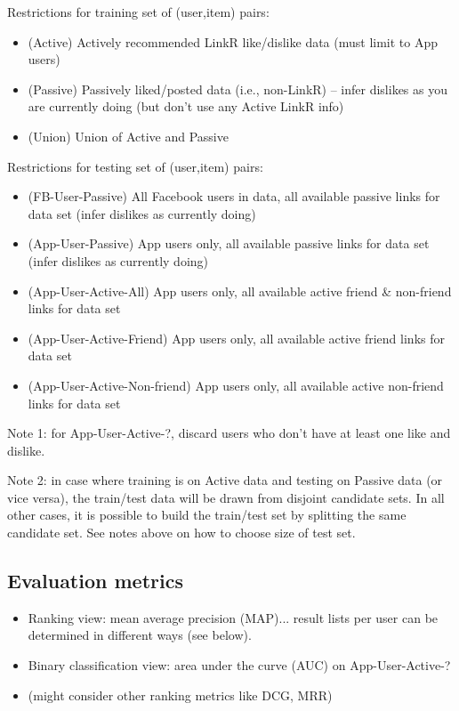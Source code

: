 \documentclass[11pt,a4paper]{article}
\begin{document}
Restrictions for training set of (user,item) pairs:

\begin{itemize}
\item (Active) Actively recommended LinkR like/dislike data (must limit to App users)
\item (Passive) Passively liked/posted data (i.e., non-LinkR) -- infer dislikes as you are currently doing (but don't use any Active LinkR info) 
\item (Union) Union of Active and Passive
\end{itemize}

Restrictions for testing set of (user,item) pairs:

\begin{itemize}
\item (FB-User-Passive) All Facebook users in data, all available passive links for data set (infer dislikes as currently doing)
\item (App-User-Passive) App users only, all available passive links for data set (infer dislikes as currently doing)
\item (App-User-Active-All) App users only, all available active friend \& non-friend links for data set
\item (App-User-Active-Friend) App users only, all available active friend links for data set
\item (App-User-Active-Non-friend) App users only, all available active non-friend links for data set
\end{itemize}

Note 1: for App-User-Active-?, discard users who don't have at least one like and dislike.

Note 2: in case where training is on Active data and testing on Passive data (or vice versa), the train/test data will be drawn from disjoint candidate sets.  In all other cases, it is possible to build the train/test set by splitting the same candidate set.  See notes above on how to choose size of test set.

\subsection{Evaluation metrics}

\begin{itemize}
\item Ranking view: mean average precision (MAP)... result lists per user can be determined in different ways (see below).
\item Binary classification view: area under the curve (AUC) on App-User-Active-?
\item (might consider other ranking metrics like DCG, MRR)
\end{itemize}
\end{document}
